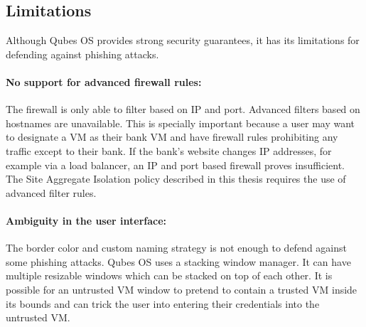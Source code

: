 
\subsection{Limitations}

Although Qubes OS provides strong security guarantees, it has its limitations for defending against phishing attacks.

\paragraph{No support for advanced firewall rules:} The firewall is only able to filter based on IP and port. Advanced filters based on hostnames are unavailable. This is specially important because a user may want to designate a VM as their bank VM and have firewall rules prohibiting any traffic except to their bank. If the bank's website changes IP addresses, for example via a load balancer, an IP and port based firewall proves insufficient. The Site Aggregate Isolation policy described in this thesis requires the use of advanced filter rules.

\paragraph{Ambiguity in the user interface:} The border color and custom naming strategy is not enough to defend against some phishing attacks. Qubes OS uses a stacking window manager. It can have multiple resizable windows which can be stacked on top of each other. It is possible for an untrusted VM window to pretend to contain a trusted VM inside its bounds and can trick the user into entering their credentials into the untrusted VM.

